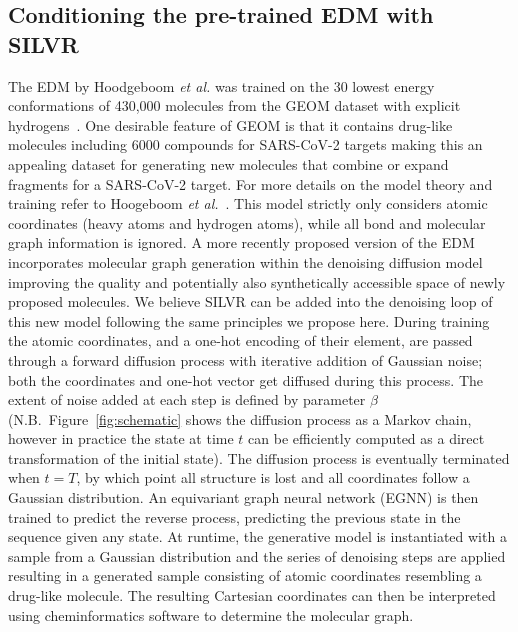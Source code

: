 \documentclass[journal=jacsat,manuscript=article]{achemso}
\begin{document}
\subsection{Conditioning the pre-trained EDM with SILVR}
The EDM by Hoodgeboom \textit{et al.} was trained on the 30 lowest energy conformations of 430,000 molecules from the GEOM dataset with explicit hydrogens~\cite{axelrod2022geom}. One desirable feature of GEOM is that it contains drug-like molecules including 6000 compounds for SARS-CoV-2 targets making this an appealing dataset for generating new molecules that combine or expand fragments for a SARS-CoV-2 target. For more details on the model theory and training refer to Hoogeboom \textit{et al.}~\cite{hoogeboom2022equivariant}. This model strictly only considers atomic coordinates (heavy atoms and hydrogen atoms), while all bond and molecular graph information is ignored. A more recently proposed version of the EDM incorporates molecular graph generation within the denoising diffusion model~\cite{vignac2023midi} improving the quality and potentially also synthetically accessible space of newly proposed molecules. We believe SILVR can be added into the denoising loop of this new model following the same principles we propose here. During training the atomic coordinates, and a one-hot encoding of their element, are passed through a forward diffusion process with iterative addition of Gaussian noise; both the coordinates and one-hot vector get diffused during this process. The extent of noise added at each step is defined by parameter $\beta$ (N.B.\ Figure~\ref{fig:schematic} shows the diffusion process as a Markov chain, however in practice the state at time $t$ can be efficiently computed as a direct transformation of the initial state). The diffusion process is eventually terminated when $t=T$, by which point all structure is lost and all coordinates follow a Gaussian distribution. An equivariant graph neural network (EGNN) is then trained to predict the reverse process, predicting the previous state in the sequence given any state. At runtime, the generative model is instantiated with a sample from a Gaussian distribution and the series of denoising steps are applied resulting in a generated sample consisting of atomic coordinates resembling a drug-like molecule. The resulting Cartesian coordinates can then be interpreted using cheminformatics software to determine the molecular graph. 
\end{document}
